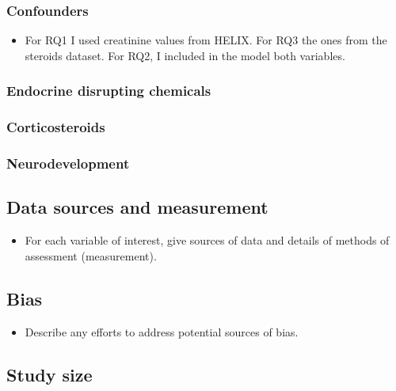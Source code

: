 \documentclass[
  letterpaper,
  DIV=11,
  numbers=noendperiod]{scrartcl}
\providecommand{\tightlist}{%
  \setlength{\itemsep}{0pt}\setlength{\parskip}{0pt}}\usepackage{longtable,booktabs,array}
\begin{document}
\subsubsection{Confounders}\label{sec-confounders}

\begin{itemize}
\tightlist
\item
  For RQ1 I used creatinine values from HELIX. For RQ3 the ones from the
  steroids dataset. For RQ2, I included in the model both variables.
\end{itemize}

\subsubsection{Endocrine disrupting chemicals}\label{sec-edcs}

\subsubsection{Corticosteroids}\label{sec-steroids}

\subsubsection{Neurodevelopment}\label{sec-neurodevelopment}

\subsection{Data sources and measurement}\label{sec-dat-sources}

\begin{itemize}
\tightlist
\item
  For each variable of interest, give sources of data and details of
  methods of assessment (measurement).
\end{itemize}

\subsection{Bias}\label{sec-bias}

\begin{itemize}
\tightlist
\item
  Describe any efforts to address potential sources of bias.
\end{itemize}

\subsection{Study size}\label{sec-size}
\end{document}
